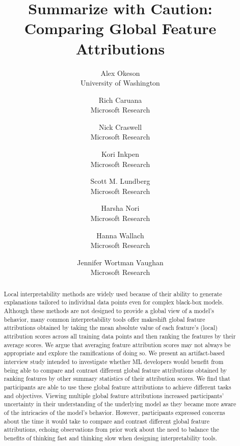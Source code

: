 \documentclass[11pt,dvipdfmx]{article}
\begin{document}
\title{Summarize with Caution: Comparing Global Feature Attributions}

\author{%
  Alex Okeson \\
  University of Washington\\
  \and
  Rich Caruana \\
  Microsoft Research \\
  \and
  Nick Craswell \\
  Microsoft Research \\
  \and
  Kori Inkpen \\
  Microsoft Research \\
  \and
  Scott M. Lundberg \\
  Microsoft Research \\
  \and
  Harsha Nori \\
  Microsoft Research \\
  \and
  Hanna Wallach \\
  Microsoft Research \\
  \and
  Jennifer Wortman Vaughan \\
  Microsoft Research \\
}




\maketitle

\begin{abstract}
  Local interpretability methods are widely used because of their
  ability to generate explanations tailored to individual data points
  even for complex black-box models. Although these methods are not
  designed to provide a global view of a model's behavior, many common
  interpretability tools offer makeshift global feature attributions
  obtained by taking the mean absolute value of each feature's (local)
  attribution scores across all training data points and then ranking
  the features by their average scores. We argue that averaging
  feature attribution scores may not always be appropriate and explore
  the ramifications of doing so. We present an artifact-based
  interview study intended to investigate whether ML developers would
  benefit from being able to compare and contrast different global
  feature attributions obtained by ranking features by other summary
  statistics of their attribution scores. We find that participants
  are able to use these global feature attributions to achieve
  different tasks and objectives. Viewing multiple global feature
  attributions increased participants' uncertainty in their
  understanding of the underlying model as they became more aware of
  the intricacies of the model's behavior. However, participants
  expressed concerns about the time it would take to compare and
  contrast different global feature attributions, echoing observations
  from prior work about the need to balance the benefits of thinking
  fast and thinking slow when designing interpretability
  tools.  \end{abstract}
\end{document}
